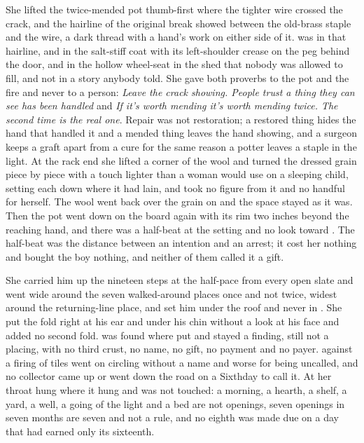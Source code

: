 She lifted the twice-mended pot thumb-first where the tighter wire crossed the crack, and the hairline of the original break showed between the old-brass staple and the wire, a dark thread with a hand's work on either side of it.  was in that hairline, and in the salt-stiff coat with its left-shoulder crease on the peg behind the door, and in the hollow wheel-seat in the shed that nobody was allowed to fill, and not in a story anybody told. She gave both proverbs to the pot and the fire and never to a person: \emph{Leave the crack showing. People trust a thing they can see has been handled} and \emph{If it's worth mending it's worth mending twice. The second time is the real one}. Repair was not restoration; a restored thing hides the hand that handled it and a mended thing leaves the hand showing, and a surgeon keeps a graft apart from a cure for the same reason a potter leaves a staple in the light. At the rack end she lifted a corner of the wool and turned the dressed grain piece by piece with a touch lighter than a woman would use on a sleeping child, setting each down where it had lain, and took no figure from it and no handful for herself. The wool went back over the grain on  and the space stayed as it was. Then the pot went down on the board again with its rim two inches beyond the reaching hand, and there was a half-beat at the setting and no look toward . The half-beat was the distance between an intention and an arrest; it cost her nothing and bought the boy nothing, and neither of them called it a gift.

She carried him up the nineteen steps at the half-pace from every open slate and went wide around the seven walked-around places once and not twice, widest around the returning-line place, and set him under the roof and never in . She put the fold right at his ear and under his chin without a look at his face and added no second fold.  was found where put and stayed a finding, still not a placing, with no third crust, no name, no gift, no payment and no payer.  against a firing of tiles went on circling without a name and worse for being uncalled, and no collector came up or went down the road on a Sixthday to call it. At her throat  hung where it hung and was not touched: a morning, a hearth, a shelf, a yard, a well, a going of the light and a bed are not openings, seven openings in seven months are seven and not a rule, and no eighth was made due on a day that had earned only its sixteenth.

